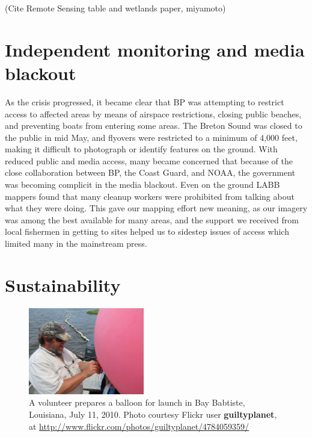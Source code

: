 \documentclass[11pt,oneside,notitlepage]{report}
\begin{document}
(Cite Remote Sensing table and wetlands paper, miyamoto)

\section{Independent monitoring and media blackout}

As the crisis progressed, it became clear that BP was attempting to restrict access to affected areas by means of airspace restrictions, closing public beaches, and preventing boats from entering some areas. The Breton Sound was closed to the public in mid May, and flyovers were restricted to a minimum of 4,000 feet, making it difficult to photograph or identify features on the ground. \cite{peters2010efforts} With reduced public and media access, many became concerned that because of the close collaboration between BP, the Coast Guard, and NOAA, the government was becoming complicit in the media blackout. Even on the ground \ac{LABB} mappers found that many cleanup workers were prohibited from talking about what they were doing. \cite{labb2010heywhat} This gave our mapping effort new meaning, as our imagery was among the best available for many areas, and the support we received from local fishermen in getting to sites helped us to sidestep issues of access which limited many in the mainstream press.

\section{Sustainability}

\begin{figure}
	\begin{flushright}
		\includegraphics[width=0.45\textwidth]{images/labb-bay-babtiste-trip.jpg}
		\caption{A volunteer prepares a balloon for launch in Bay Babtiste, Louisiana, July 11, 2010. Photo courtesy Flickr user \textbf{guiltyplanet}, at \url{http://www.flickr.com/photos/guiltyplanet/4784059359/}}
	\end{flushright}
\end{figure}
\end{document}

